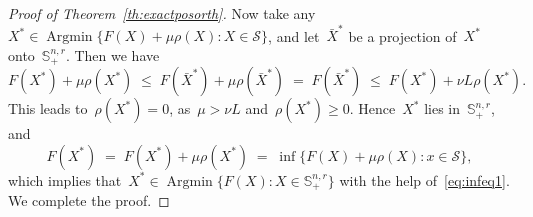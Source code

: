 \documentclass[11pt,a4paper]{article}  %
\theoremstyle{definition}
\DeclareMathOperator*{\Argmin}{Argmin}
\newcommand{\sset}{\mathcal{S}}
\newcommand{\res}{\rho}
\newcommand{\pen}{\res}
\newcommand{\penpar}{\mu}
\newcommand{\col}{r}
\newcommand{\stf}[1]{\mathbb{S}^{#1}}
\begin{document}
\begin{proof}[Proof of Theorem~\ref{th:exactposorth}]
    Now take any~$X^* \in \Argmin\{F(X) + \penpar \pen(X)\mathrel{:} X \in
    \sset\}$, and let~$\bar{X}^*$ be a projection of~$X^*$ onto~$\stf{n, \col}_+$. Then we have
    \begin{equation}
        \nonumber
        F(X^*) + \penpar   \pen(X^*)  \;\le\; F(\bar{X}^*)  + \penpar \pen(\bar{X}^*)
        \;=\; F(\bar{X}^*) \;\le\; F(X^*) + \nu L \pen(X^*).
    \end{equation}
   This leads to~$\pen(X^*)=0$,
   as~$\penpar >  \nu L$ and~$\pen(X^*) \ge 0$.  Hence~$X^*$ lies in~$\stf{n, \col}_+$, and
    \begin{equation}
        \nonumber
        F(X^*) \;=\; F(X^*) + \penpar \pen(X^*) \;=\; \inf\{F(X) +\penpar \pen(X)\mathrel{:}  x\in\sset\},
    \end{equation}
    which implies that~$X^*\in  \Argmin\{F(X)\mathrel{:} X \in\stf{n, \col}_+\}$ with the help
    of~\eqref{eq:infeq1}.
    We complete the proof.
\end{proof}
\end{document}
